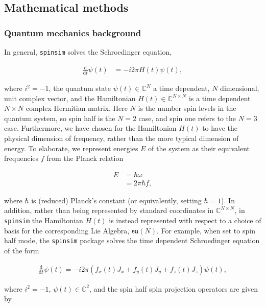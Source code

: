 \documentclass{jors}
\begin{document}
	\subsection{Mathematical methods}
		\subsubsection{Quantum mechanics background}
			In general, \texttt{spinsim} solves the Schroedinger equation,

			\begin{align}
				\frac{\mathrm{d}}{\mathrm{d}t}\psi(t) &= -i2\pi H(t)\psi(t),\label{eq:schroedinger}
			\end{align}

			where \(i^2 = -1\), the quantum state \(\psi(t) \in \mathbb{C}^N\) a time dependent, \(N\) dimensional, unit complex vector, and the Hamiltonian \(H(t) \in \mathbb{C}^{N \times N}\) is a time dependent \(N \times N\) complex Hermitian matrix. Here \(N\) is the number spin levels in the quantum system, so spin half is the \(N = 2\) case, and spin one refers to the \(N = 3\) case. Furthermore, we have chosen for the Hamiltonian \(H(t)\) to have the physical dimension of frequency, rather than the more typical dimension of energy. To elaborate, we represent energies \(E\) of the system as their equivalent frequencies \(f\) from the Planck relation
			
			\begin{align}
				E &= \hbar \omega\\
				&= 2\pi\hbar f,
			\end{align}
			
			where \(\hbar\) is (reduced) Planck's constant (or equivalently, setting 
			\(\hbar = 1\)). In addition, rather than being represented by standard coordinates in \(\mathbb{C}^{N \times N}\), in \texttt{spinsim} the Hamiltonian \(H(t)\) is instead represented with respect to a choice of basis for the corresponding Lie Algebra, \(\mathfrak{su}(N)\). For example, when set to spin half mode, the \texttt{spinsim} package solves the time dependent Schroedinger equation of the form

			\begin{align}
				\frac{\mathrm{d}}{\mathrm{d}t}\psi(t) = -i 2\pi (f_x(t) J_x + f_y(t) J_y + f_z(t) J_z) \psi(t),
			\end{align}

			where \(i^2 = -1\), \(\psi(t) \in \mathbb{C}^2\), and the spin half spin projection operators are given by
\end{document}
